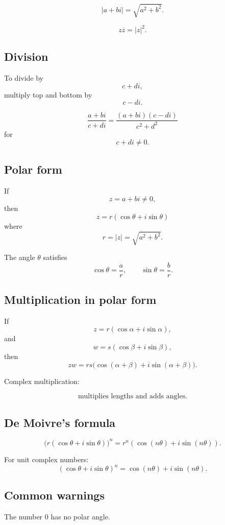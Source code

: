 \[
\boxed{
    |a+bi|=\sqrt{a^2+b^2}.
}
\]

\[
\boxed{
    z\overline z=|z|^2.
}
\]

\subsection*{Division}

To divide by
\[
    c+di,
\]
multiply top and bottom by
\[
    c-di.
\]

\[
\boxed{
    \frac{a+bi}{c+di}
    =
    \frac{(a+bi)(c-di)}{c^2+d^2}
}
\]
for
\[
    c+di\ne0.
\]

\subsection*{Polar form}

If
\[
    z=a+bi\ne0,
\]
then
\[
\boxed{
    z=r(\cos\theta+i\sin\theta)
}
\]
where
\[
\boxed{
    r=|z|=\sqrt{a^2+b^2}.
}
\]

The angle \(\theta\) satisfies
\[
    \cos\theta=\frac ar,
    \qquad
    \sin\theta=\frac br.
\]

\subsection*{Multiplication in polar form}

If
\[
    z=r(\cos\alpha+i\sin\alpha),
\]
and
\[
    w=s(\cos\beta+i\sin\beta),
\]
then
\[
\boxed{
    zw
    =
    rs\bigl(\cos(\alpha+\beta)+i\sin(\alpha+\beta)\bigr).
}
\]

Complex multiplication:

\[
\boxed{
    \text{multiplies lengths and adds angles.}
}
\]

\subsection*{De Moivre's formula}

\[
\boxed{
    \bigl(r(\cos\theta+i\sin\theta)\bigr)^n
    =
    r^n(\cos(n\theta)+i\sin(n\theta)).
}
\]

For unit complex numbers:
\[
\boxed{
    (\cos\theta+i\sin\theta)^n
    =
    \cos(n\theta)+i\sin(n\theta).
}
\]

\subsection*{Common warnings}

The number \(0\) has no polar angle.

